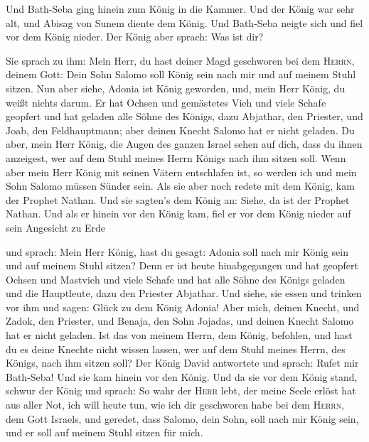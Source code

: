  Und Bath-Seba ging hinein zum König in die Kammer. Und
der König war sehr alt, und Abisag von Sunem diente dem König.
 Und Bath-Seba neigte sich und fiel vor dem König nieder.
Der König aber sprach: Was ist dir?

 Sie sprach zu ihm: Mein Herr, du hast deiner Magd
geschworen bei dem \textsc{Herrn}, deinem Gott: Dein Sohn Salomo soll
König sein nach mir und auf meinem Stuhl sitzen.  Nun
aber siehe, Adonia ist König geworden, und, mein Herr König, du weißt
nichts darum.  Er hat Ochsen und gemästetes Vieh und
viele Schafe geopfert und hat geladen alle Söhne des Königs, dazu
Abjathar, den Priester, und Joab, den Feldhauptmann; aber deinen Knecht
Salomo hat er nicht geladen.  Du aber, mein Herr König,
die Augen des ganzen Israel sehen auf dich, dass du ihnen anzeigest, wer
auf dem Stuhl meines Herrn Königs nach ihm sitzen soll. 
Wenn aber mein Herr König mit seinen Vätern entschlafen ist, so werden
ich und mein Sohn Salomo müssen Sünder sein.  Als sie
aber noch redete mit dem König, kam der Prophet Nathan. 
Und sie sagten's dem König an: Siehe, da ist der Prophet Nathan. Und als
er hinein vor den König kam, fiel er vor dem König nieder auf sein
Angesicht zu Erde

 und sprach: Mein Herr König, hast du gesagt: Adonia soll
nach mir König sein und auf meinem Stuhl sitzen?  Denn er
ist heute hinabgegangen und hat geopfert Ochsen und Mastvieh und viele
Schafe und hat alle Söhne des Königs geladen und die Hauptleute, dazu
den Priester Abjathar. Und siehe, sie essen und trinken vor ihm und
sagen: Glück zu dem König Adonia!  Aber mich, deinen
Knecht, und Zadok, den Priester, und Benaja, den Sohn Jojadas, und
deinen Knecht Salomo hat er nicht geladen.  Ist das von
meinem Herrn, dem König, befohlen, und hast du es deine Knechte nicht
wissen lassen, wer auf dem Stuhl meines Herrn, des Königs, nach ihm
sitzen soll?  Der König David antwortete und sprach:
Rufet mir Bath-Seba! Und sie kam hinein vor den König. Und da sie vor
dem König stand,  schwur der König und sprach: So wahr
der \textsc{Herr} lebt, der meine Seele erlöst hat aus aller Not,
 ich will heute tun, wie ich dir geschworen habe bei dem
\textsc{Herrn}, dem Gott Israels, und geredet, dass Salomo, dein Sohn,
soll nach mir König sein, und er soll auf meinem Stuhl sitzen für mich.

